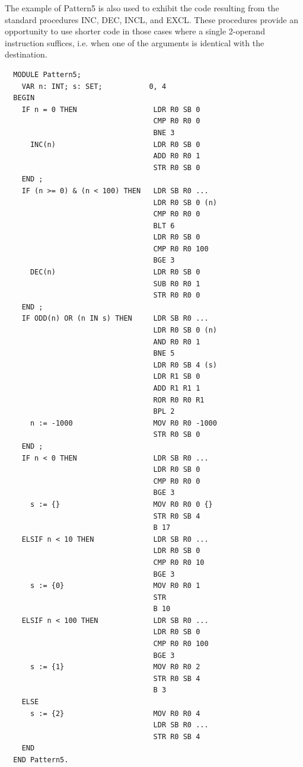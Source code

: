 The example of Pattern5 is also used to exhibit the code resulting from the standard procedures
INC, DEC, INCL, and EXCL. These procedures provide an opportunity to use shorter code in those
cases where a single 2-operand instruction suffices, i.e. when one of the arguments is identical
with the destination.

\begin{verbatim}
  MODULE Pattern5;
    VAR n: INT; s: SET;           0, 4
  BEGIN
    IF n = 0 THEN                  LDR R0 SB 0     
                                   CMP R0 R0 0
                                   BNE 3
      INC(n)                       LDR R0 SB 0
                                   ADD R0 R0 1
                                   STR R0 SB 0
    END ;                          
    IF (n >= 0) & (n < 100) THEN   LDR SB R0 ...
                                   LDR R0 SB 0 (n)
                                   CMP R0 R0 0
                                   BLT 6
                                   LDR R0 SB 0
                                   CMP R0 R0 100
                                   BGE 3
      DEC(n)                       LDR R0 SB 0
                                   SUB R0 R0 1
                                   STR R0 R0 0
    END ;                          
    IF ODD(n) OR (n IN s) THEN     LDR SB R0 ...
                                   LDR R0 SB 0 (n)
                                   AND R0 R0 1
                                   BNE 5
                                   LDR R0 SB 4 (s)
                                   LDR R1 SB 0
                                   ADD R1 R1 1
                                   ROR R0 R0 R1
                                   BPL 2
      n := -1000                   MOV R0 R0 -1000
                                   STR R0 SB 0
    END ;                          
    IF n < 0 THEN                  LDR SB R0 ...
                                   LDR R0 SB 0
                                   CMP R0 R0 0
                                   BGE 3
      s := {}                      MOV R0 R0 0 {}
                                   STR R0 SB 4
                                   B 17
    ELSIF n < 10 THEN              LDR SB R0 ...
                                   LDR R0 SB 0
                                   CMP R0 R0 10
                                   BGE 3
      s := {0}                     MOV R0 R0 1
                                   STR
                                   B 10
    ELSIF n < 100 THEN             LDR SB R0 ...
                                   LDR R0 SB 0
                                   CMP R0 R0 100
                                   BGE 3
      s := {1}                     MOV R0 R0 2
                                   STR R0 SB 4
                                   B 3
    ELSE                           
      s := {2}                     MOV R0 R0 4
                                   LDR SB R0 ...
                                   STR R0 SB 4
    END
  END Pattern5.
\end{verbatim}

